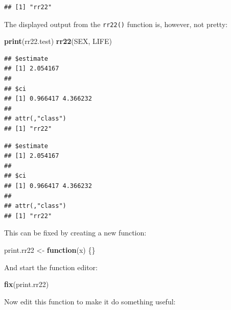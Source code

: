 \documentclass[12pt,a4paper]{book}
\newenvironment{Shaded}{\begin{snugshade}}{\end{snugshade}}
\newcommand{\KeywordTok}[1]{\textcolor[rgb]{0.13,0.29,0.53}{\textbf{#1}}}
\newcommand{\DataTypeTok}[1]{\textcolor[rgb]{0.13,0.29,0.53}{#1}}
\newcommand{\DecValTok}[1]{\textcolor[rgb]{0.00,0.00,0.81}{#1}}
\newcommand{\CharTok}[1]{\textcolor[rgb]{0.31,0.60,0.02}{#1}}
\newcommand{\StringTok}[1]{\textcolor[rgb]{0.31,0.60,0.02}{#1}}
\newcommand{\ControlFlowTok}[1]{\textcolor[rgb]{0.13,0.29,0.53}{\textbf{#1}}}
\newcommand{\OperatorTok}[1]{\textcolor[rgb]{0.81,0.36,0.00}{\textbf{#1}}}
\newcommand{\NormalTok}[1]{#1}
\theoremstyle{definition}
\theoremstyle{definition}
\theoremstyle{definition}
\theoremstyle{remark}
\begin{document}
\begin{verbatim}
## [1] "rr22"
\end{verbatim}

The displayed output from the \texttt{rr22()} function is, however, not
pretty:

\begin{Shaded}
\begin{Highlighting}[]
\KeywordTok{print}\NormalTok{(rr22.test)}
\KeywordTok{rr22}\NormalTok{(SEX, LIFE)}
\end{Highlighting}
\end{Shaded}

\begin{verbatim}
## $estimate
## [1] 2.054167
## 
## $ci
## [1] 0.966417 4.366232
## 
## attr(,"class")
## [1] "rr22"
\end{verbatim}

\begin{verbatim}
## $estimate
## [1] 2.054167
## 
## $ci
## [1] 0.966417 4.366232
## 
## attr(,"class")
## [1] "rr22"
\end{verbatim}

This can be fixed by creating a new function:

\begin{Shaded}
\begin{Highlighting}[]
\NormalTok{print.rr22 <-}\StringTok{ }\ControlFlowTok{function}\NormalTok{(x) \{\}}
\end{Highlighting}
\end{Shaded}

And start the function editor:

\begin{Shaded}
\begin{Highlighting}[]
\KeywordTok{fix}\NormalTok{(print.rr22)}
\end{Highlighting}
\end{Shaded}

Now edit this function to make it do something useful:

\begin{Shaded}
\end{Shaded}
\end{document}
